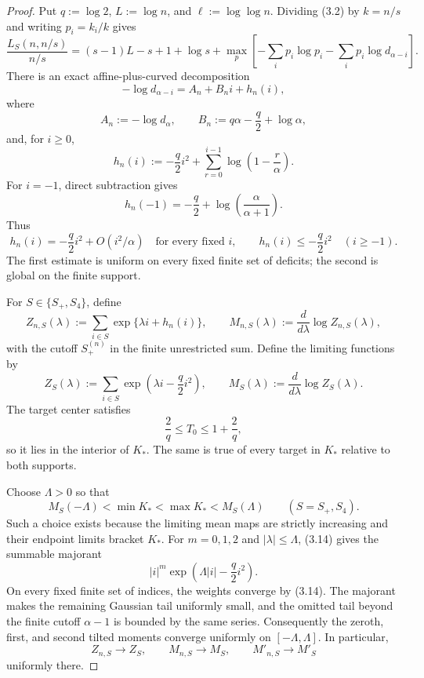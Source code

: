 \begin{proof}
Put $q:=\log 2$, $L:=\log n$, and $\ell:=\log\log n$.
Dividing (3.2) by $k=n/s$ and writing $p_i=k_i/k$ gives
\[
  \frac{L_S(n,n/s)}{n/s}
  =(s-1)L-s+1+\log s
   +\max_p\left[-\sum_i p_i\log p_i
                 -\sum_i p_i\log d_{\alpha-i}\right].
\]
There is an exact affine-plus-curved decomposition
\begin{equation*}
  -\log d_{\alpha-i}=A_n+B_ni+h_n(i),
  \tag{3.11}
\end{equation*}
where
\begin{equation*}
  A_n:=-\log d_\alpha,
  \qquad
  B_n:=q\alpha-\frac q2+\log\alpha,
  \tag{3.12}
\end{equation*}
and, for $i\ge0$,
\begin{equation*}
  h_n(i)
  :=-\frac q2i^2
    +\sum_{r=0}^{i-1}\log\!\left(1-\frac r\alpha\right).
  \tag{3.13}
\end{equation*}
For $i=-1$, direct subtraction gives
\[
  h_n(-1)=-\frac q2+\log\!\left(\frac{\alpha}{\alpha+1}\right).
\]
Thus
\begin{equation*}
  h_n(i)=-\frac q2i^2+O(i^2/\alpha)
  \quad\text{for every fixed }i,
  \qquad
  h_n(i)\le-\frac q2i^2
  \quad(i\ge-1).
  \tag{3.14}
\end{equation*}
The first estimate is uniform on every fixed finite set of deficits; the
second is global on the finite support.

For $S\in\{S_+,S_4\}$, define
\[
  Z_{n,S}(\lambda)
  :=\sum_{i\in S}
    \exp\{\lambda i+h_n(i)\},
  \qquad
  M_{n,S}(\lambda)
  :=\frac{d}{d\lambda}\log Z_{n,S}(\lambda),
\]
with the cutoff $S_+^{(n)}$ in the finite unrestricted sum. Define the
limiting functions by
\[
  Z_S(\lambda)
  :=\sum_{i\in S}
    \exp\!\left(\lambda i-\frac q2i^2\right),
  \qquad
  M_S(\lambda):=\frac{d}{d\lambda}\log Z_S(\lambda).
\]
The target center satisfies
\begin{equation*}
  \frac2q\le T_0\le1+\frac2q,
  \tag{3.15}
\end{equation*}
so it lies in the interior of $K_*$. The same is true of every target in
$K_*$ relative to both supports.

Choose $\Lambda>0$ so that
\[
  M_S(-\Lambda)<\min K_*<\max K_*<M_S(\Lambda)
  \qquad(S=S_+,S_4).
\]
Such a choice exists because the limiting mean maps are strictly increasing
and their endpoint limits bracket $K_*$. For $m=0,1,2$ and
$|\lambda|\le\Lambda$, (3.14) gives the summable majorant
\[
  |i|^m\exp\!\left(\Lambda|i|-\frac q2i^2\right).
\]
On every fixed finite set of indices, the weights converge by (3.14). The
majorant makes the remaining Gaussian tail uniformly small, and the omitted
tail beyond the finite cutoff $\alpha-1$ is bounded by the same series.
Consequently the zeroth, first, and second tilted moments converge uniformly
on $[-\Lambda,\Lambda]$. In particular,
\[
  Z_{n,S}\to Z_S,
  \qquad
  M_{n,S}\to M_S,
  \qquad
  M'_{n,S}\to M'_S
\]
uniformly there.


\end{proof}
